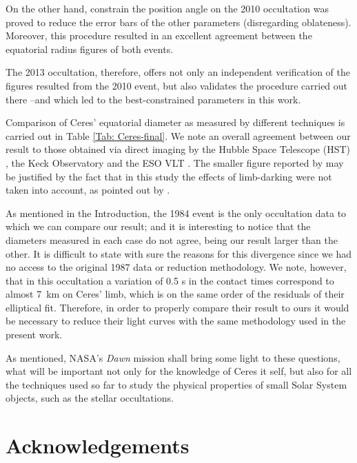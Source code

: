 \documentclass[useAMS,usenatbib]{mn2e}
\begin{document}
On the other hand, constrain the position angle on the 2010 occultation was proved to reduce the error bars of the other parameters (disregarding oblateness). Moreover, this procedure resulted in an excellent agreement between the equatorial radius figures of both events.

The 2013 occultation, therefore, offers not only an independent verification of the figures resulted from the 2010 event, but also validates the procedure carried out there --and which led to the best-constrained parameters in this work.

Comparison of Ceres' equatorial diameter as measured by different techniques is carried out in Table \ref{Tab: Ceres-final}. We note an overall agreement between our result to those obtained via direct imaging by the Hubble Space Telescope (HST) \citep{Thomas2005}, the Keck Observatory and the ESO VLT \citep{Drummond2014}. The smaller figure reported by \cite{Carry2008} may be justified by the fact that in this study the effects of limb-darking were not taken into account, as pointed out by \cite{Drummond2014}.

As mentioned in the Introduction, the 1984 event \citep{Millis1987} is the only occultation data to which we can compare our result; and it is interesting to notice that the diameters measured in each case do not agree, being our result larger than the other. It is difficult to state with sure the reasons for this divergence since we had no access to the original 1987 data or reduction methodology. We note, however, that in this occultation a variation of 0.5 s in the contact times correspond to almost 7~km on Ceres' limb, which is on the same order of the residuals of their elliptical fit. Therefore, in order to properly compare their result to ours it would be necessary to reduce their light curves with the same methodology used in the present work.

As mentioned, NASA's \textit{Dawn} mission shall bring some light to these questions, what will be important not only for the knowledge of Ceres it self, but also for all the techniques used so far to study the physical properties of small Solar System objects, such as the stellar occultations.





\section*{Acknowledgements}
\end{document}
